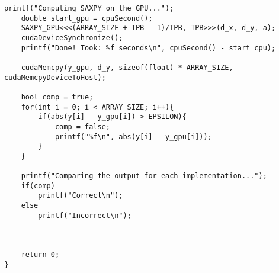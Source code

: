 \documentclass[english]{exam}
\begin{document}
\begin{lstlisting}[style=CStyle]
	printf("Computing SAXPY on the GPU...");
	double start_gpu = cpuSecond();
	SAXPY_GPU<<<(ARRAY_SIZE + TPB - 1)/TPB, TPB>>>(d_x, d_y, a);
	cudaDeviceSynchronize();
	printf("Done! Took: %f seconds\n", cpuSecond() - start_cpu);
	
	cudaMemcpy(y_gpu, d_y, sizeof(float) * ARRAY_SIZE, cudaMemcpyDeviceToHost);

	bool comp = true;
	for(int i = 0; i < ARRAY_SIZE; i++){
		if(abs(y[i] - y_gpu[i]) > EPSILON){
			comp = false;
			printf("%f\n", abs(y[i] - y_gpu[i]));
		}
	}
	
	printf("Comparing the output for each implementation...");
	if(comp)
		printf("Correct\n");
	else
		printf("Incorrect\n");
	
	

	return 0;
}

\end{lstlisting}


\renewcommand{\bibname}{References}

\end{document}
